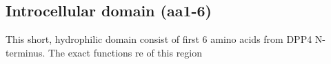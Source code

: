 \subsection{Introcellular domain (aa1-6)}

This short, hydrophilic domain consist of first 6 amino acids from DPP4 N-terminus. The exact functions re of this region 
